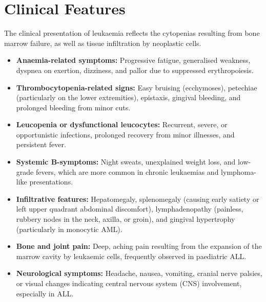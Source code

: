 \section*{Clinical Features}
The clinical presentation of leukaemia reflects the cytopenias resulting from bone marrow failure, as well as tissue infiltration by neoplastic cells.
\begin{itemize}
    \item \textbf{Anaemia-related symptoms:} Progressive fatigue, generalised weakness, dyspnea on exertion, dizziness, and pallor due to suppressed erythropoiesis.
    \item \textbf{Thrombocytopenia-related signs:} Easy bruising (ecchymoses), petechiae (particularly on the lower extremities), epistaxis, gingival bleeding, and prolonged bleeding from minor cuts.
    \item \textbf{Leucopenia or dysfunctional leucocytes:} Recurrent, severe, or opportunistic infections, prolonged recovery from minor illnesses, and persistent fever.
    \item \textbf{Systemic B-symptoms:} Night sweats, unexplained weight loss, and low-grade fevers, which are more common in chronic leukaemias and lymphoma-like presentations.
    \item \textbf{Infiltrative features:} Hepatomegaly, splenomegaly (causing early satiety or left upper quadrant abdominal discomfort), lymphadenopathy (painless, rubbery nodes in the neck, axilla, or groin), and gingival hypertrophy (particularly in monocytic AML).
    \item \textbf{Bone and joint pain:} Deep, aching pain resulting from the expansion of the marrow cavity by leukaemic cells, frequently observed in paediatric ALL.
    \item \textbf{Neurological symptoms:} Headache, nausea, vomiting, cranial nerve palsies, or visual changes indicating central nervous system (CNS) involvement, especially in ALL.
\end{itemize}

